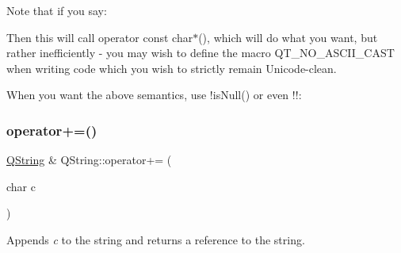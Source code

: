 \begin{DoxyCode}{0}
\end{DoxyCode}


Note that if you say\+:


\begin{DoxyCode}{0}
\end{DoxyCode}


Then this will call {\ttfamily operator const char$\ast$()}, which will do what you want, but rather inefficiently -\/ you may wish to define the macro Q\+T\+\_\+\+N\+O\+\_\+\+A\+S\+C\+I\+I\+\_\+\+C\+A\+ST when writing code which you wish to strictly remain Unicode-\/clean.

When you want the above semantics, use {\ttfamily !is\+Null()} or even {\ttfamily !!}\+:


\begin{DoxyCode}{0}
\end{DoxyCode}
 \mbox{\label{class_q_string_a44ea6d9b60995e1147f887a4e5543a1c}} 
\subsubsection{\texorpdfstring{operator+=()}{operator+=()}\hspace{0.1cm}{\footnotesize\ttfamily [1/3]}}
{\footnotesize\ttfamily \mbox{\hyperlink{class_q_string}{Q\+String}} \& Q\+String\+::operator+= (\begin{DoxyParamCaption}\item[{char}]{c }\end{DoxyParamCaption})}

Appends {\itshape c} to the string and returns a reference to the string. \mbox{\label{class_q_string_a01ef0a41636e87e459fc42f2bb2c0a70}} 
